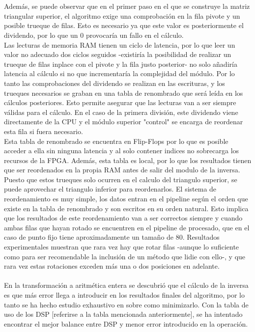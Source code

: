 \\
\\
Además, se puede observar que en el primer paso en el que se construye la matriz triangular superior, el algoritmo exige una comprobación en la fila pivote y un posible trueque de filas. Esto es necesario ya que este valor es posteriormente el dividendo, por lo que un 0 provocaría un fallo en el cálculo.
\\
Las lecturas de memoria RAM tienen un ciclo de latencia, por lo que leer un valor no adecuado dos ciclos seguidos -existiría la posibilidad de realizar un trueque de filas inplace con el pivote y la fila justo posterior- no solo añadiría latencia al cálculo si no que incrementaría la complejidad del módulo. Por lo tanto las comprobaciones del dividendo se realizan en las escrituras, y los trueques necesarios se graban en una tabla de renombrado que será leída en los cálculos posteriores. Esto permite asegurar que las lecturas van a ser siempre válidas para el cálculo. En el caso de la primera división, este dividendo viene directamente de la CPU y el módulo superior "control" se encarga de reordenar esta fila si fuera necesario.
\\
Esta tabla de renombrado se encuentra en Flip-Flops por lo que es posible acceder a ella sin ninguna latencia y al solo contener indices no sobrecarga los recursos de la FPGA. Además, esta tabla es local, por lo que los resultados tienen que ser reordenados en la propia RAM antes de salir del modulo de la inversa. Puesto que estos trueques solo ocurren en el calculo del triangulo superior, se puede aprovechar el triangulo inferior para reordenarlos. El sistema de reordenamiento es muy simple, los datos entran en el pipeline según el orden que existe en la tabla de renombrado y son escritos en su orden natural. Esto implica que los resultados de este reordenamiento van a ser correctos siempre y cuando ambas filas que hayan rotado se encuentren en el pipeline de procesado, que en el caso de  punto fijo tiene aproximadamente un tamaño de 80. Resultados experimentales muestran que rara vez hay que rotar filas -aunque lo suficiente como para ser recomendable la inclusión de un método que lidie con ello-, y que rara vez estas rotaciones exceden más una o dos posiciones en adelante.
\\
\\
En la transformación a aritmética entera se descubrió que el cálculo de la inversa es que más error llega a introducir en los resultados finales del algoritmo, por lo tanto se ha hecho estudio exhaustivo en  sobre como minimizarlo. Con la tabla de uso de los DSP [referirse a la tabla mencionada anteriormente], se ha intentado encontrar el mejor balance entre DSP y menor error introducido en la operación.

